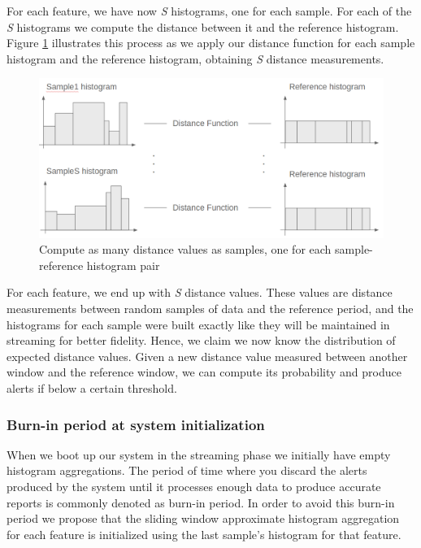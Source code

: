 For each feature, we have now \textit{S} histograms, one for each sample. For each of the \textit{S} histograms we compute the distance between it and the reference histogram. Figure \ref{fig:compute-sample-distances} illustrates this process as we apply our distance function for each sample histogram and the reference histogram, obtaining \textit{S} distance measurements.

\begin{figure}[!htb]
    \begin{center}
      \includegraphics[scale=0.4]{figures/compute-sample-distances.png}
      \caption[Compute as many distance values as samples]{Compute as many distance values as samples, one for each sample-reference histogram pair}
      \label{fig:compute-sample-distances}
    \end{center}
\end{figure}

For each feature, we end up with \textit{S} distance values. These values are distance measurements between random samples of data and the reference period, and the histograms for each sample were built exactly like they will be maintained in streaming for better fidelity. Hence, we claim we now know the distribution of expected distance values. Given a new distance value measured between another window and the reference window, we can compute its probability and produce alerts if below a certain threshold.

\subsubsection*{Burn-in period at system initialization}
When we boot up our system in the streaming phase we initially have empty histogram aggregations. The period of time where you discard the alerts produced by the system until it processes enough data to produce accurate reports is commonly denoted as burn-in period. In order to avoid this burn-in period we propose that the sliding window approximate histogram aggregation for each feature is initialized using the last sample's histogram for that feature.

